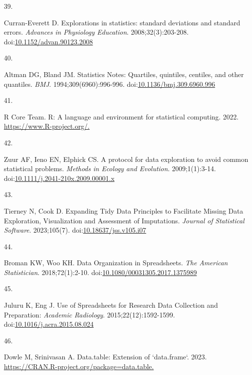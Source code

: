 \documentclass[
]{book}
\newlength{\cslhangindent}
\newlength{\csllabelwidth}
\newlength{\cslentryspacingunit} %
\newenvironment{CSLReferences}[2] %
 {%
  \setlength{\parindent}{0pt}
  \ifodd #1
  \let\oldpar\par
  \def\par{\hangindent=\cslhangindent\oldpar}
  \fi
  \setlength{\parskip}{#2\cslentryspacingunit}
 }%
 {}
\newcommand{\CSLLeftMargin}[1]{\parbox[t]{\csllabelwidth}{#1}}
\newcommand{\CSLRightInline}[1]{\parbox[t]{\linewidth - \csllabelwidth}{#1}\break}
\begin{document}
\begin{CSLReferences}{0}{0}
\leavevmode{}%
\CSLLeftMargin{39. }%
\CSLRightInline{Curran-Everett D. Explorations in statistics: standard deviations and standard errors. \emph{Advances in Physiology Education}. 2008;32(3):203-208. doi:\href{https://doi.org/10.1152/advan.90123.2008}{10.1152/advan.90123.2008}}

\leavevmode{}%
\CSLLeftMargin{40. }%
\CSLRightInline{Altman DG, Bland JM. Statistics Notes: Quartiles, quintiles, centiles, and other quantiles. \emph{BMJ}. 1994;309(6960):996-996. doi:\href{https://doi.org/10.1136/bmj.309.6960.996}{10.1136/bmj.309.6960.996}}

\leavevmode{}%
\CSLLeftMargin{41. }%
\CSLRightInline{R Core Team. R: A language and environment for statistical computing. 2022. \href{https://www.R-project.org/}{https://www.R-project.org/.}}

\leavevmode{}%
\CSLLeftMargin{42. }%
\CSLRightInline{Zuur AF, Ieno EN, Elphick CS. A protocol for data exploration to avoid common statistical problems. \emph{Methods in Ecology and Evolution}. 2009;1(1):3-14. doi:\href{https://doi.org/10.1111/j.2041-210x.2009.00001.x}{10.1111/j.2041-210x.2009.00001.x}}

\leavevmode{}%
\CSLLeftMargin{43. }%
\CSLRightInline{Tierney N, Cook D. Expanding Tidy Data Principles to Facilitate Missing Data Exploration, Visualization and Assessment of Imputations. \emph{Journal of Statistical Software}. 2023;105(7). doi:\href{https://doi.org/10.18637/jss.v105.i07}{10.18637/jss.v105.i07}}

\leavevmode{}%
\CSLLeftMargin{44. }%
\CSLRightInline{Broman KW, Woo KH. Data Organization in Spreadsheets. \emph{The American Statistician}. 2018;72(1):2-10. doi:\href{https://doi.org/10.1080/00031305.2017.1375989}{10.1080/00031305.2017.1375989}}

\leavevmode{}%
\CSLLeftMargin{45. }%
\CSLRightInline{Juluru K, Eng J. Use of Spreadsheets for Research Data Collection and Preparation: \emph{Academic Radiology}. 2015;22(12):1592-1599. doi:\href{https://doi.org/10.1016/j.acra.2015.08.024}{10.1016/j.acra.2015.08.024}}

\leavevmode{}%
\CSLLeftMargin{46. }%
\CSLRightInline{Dowle M, Srinivasan A. Data.table: Extension of `data.frame`. 2023. \href{https://CRAN.R-project.org/package=data.table}{https://CRAN.R-project.org/package=data.table.}}


\end{CSLReferences}
\end{document}
